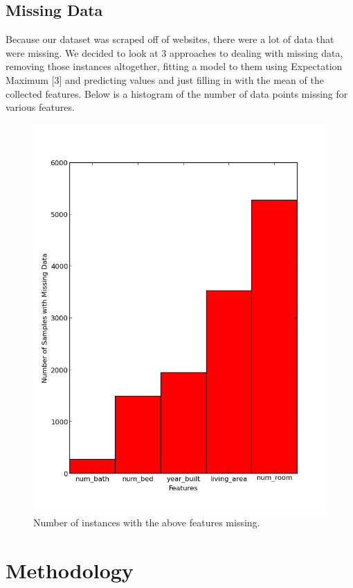 \documentclass{acm_proc_article-sp}
\begin{document}
\subsection{Missing Data}

	Because our dataset was scraped off of websites, there were a lot of data that were missing. We decided to look at 3 approaches to dealing with missing data, removing those instances altogether, fitting a model to them using Expectation Maximum [3] and predicting values and just filling in with the mean of the collected features. Below is a histogram of the number of data points missing  for various features.
	
	\begin{figure}[h!]
   		\centering
  		\includegraphics[width=\linewidth]{missing_data.png}
    		\caption{Number of instances with the above features missing. }
    		\label{fig:missingdata}
	\end{figure}
	
\section{Methodology}
	
\end{document}
